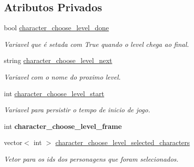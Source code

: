 \subsection*{Atributos Privados}
\begin{DoxyCompactItemize}
\item 
\mbox{\label{classCharacterChooseLevel_adf70304df201b570b5be8cebe8c438f8}} 
bool \mbox{\hyperlink{classCharacterChooseLevel_adf70304df201b570b5be8cebe8c438f8}{character\+\_\+choose\+\_\+level\+\_\+done}}
\begin{DoxyCompactList}\small\item\em Variavel que é setada com True quando o level chega ao final. \end{DoxyCompactList}\item 
\mbox{\label{classCharacterChooseLevel_a16441ab2ee7e4596a94109f1d477411d}} 
string \mbox{\hyperlink{classCharacterChooseLevel_a16441ab2ee7e4596a94109f1d477411d}{character\+\_\+choose\+\_\+level\+\_\+next}}
\begin{DoxyCompactList}\small\item\em Variavel com o nome do proximo level. \end{DoxyCompactList}\item 
\mbox{\label{classCharacterChooseLevel_abe71bb4468b8fd8aa46f65a51e6323ef}} 
int \mbox{\hyperlink{classCharacterChooseLevel_abe71bb4468b8fd8aa46f65a51e6323ef}{character\+\_\+choose\+\_\+level\+\_\+start}}
\begin{DoxyCompactList}\small\item\em Variavel para persistir o tempo de inicio de jogo. \end{DoxyCompactList}\item 
\mbox{\label{classCharacterChooseLevel_a17fab0256229c4d380e802b44331f095}} 
int {\bfseries character\+\_\+choose\+\_\+level\+\_\+frame}
\item 
\mbox{\label{classCharacterChooseLevel_ae9ab65c7d99db77be88677e1d22e8ca4}} 
vector$<$ int $>$ \mbox{\hyperlink{classCharacterChooseLevel_ae9ab65c7d99db77be88677e1d22e8ca4}{character\+\_\+choose\+\_\+level\+\_\+selected\+\_\+characters}}
\begin{DoxyCompactList}\small\item\em Vetor para os ids dos personagens que foram selecionados. \end{DoxyCompactList}\item 

\end{DoxyCompactItemize}
